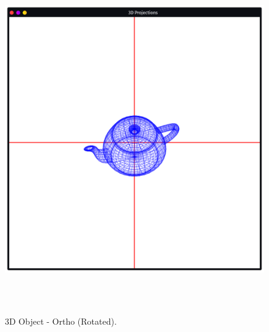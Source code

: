\documentclass[12pt, a4]{article}
\begin{document}
\subsection*{}
\begin{figure}[h]
\centering
\caption{3D Object - Ortho (Rotated).}
\includegraphics[height=15cm, width=15cm]{Outputs/Ortho2.png}
\end{figure}

\newpage
\end{document}
